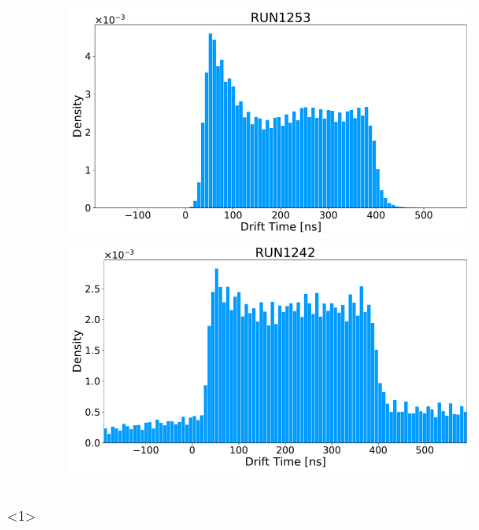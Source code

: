 \documentclass{beamer}
\begin{document}
\begin{frame}
{\begin{columns}
\begin{column}{0.5\textwidth}
			\end{column}


			\begin{column}{0.5\textwidth}

					\begin{figure}
						\centering 
						\includegraphics[width=1.0\textwidth]{./Images/1253_blue.pdf}
						\includegraphics[width=1.0\textwidth]{./Images/1242_blue.pdf}
					\end{figure}

			\end{column}
		\end{columns}
		}<1>

\end{frame}
\end{document}
